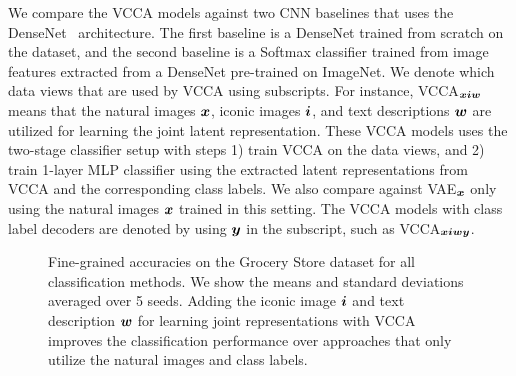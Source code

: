 We compare the VCCA models against two CNN baselines that uses the DenseNet~\cite{huang2017densely} architecture. The first baseline is a DenseNet trained from scratch on the dataset, and the second baseline is a Softmax classifier trained from image features extracted from a DenseNet pre-trained on ImageNet. We denote which data views that are used by VCCA using subscripts. For instance, VCCA$_{{\bm{x}} {\bm{i}} {\bm{w}}}$ means that the natural images ${\bm{x}}$, iconic images ${\bm{i}}$, and text descriptions ${\bm{w}}$ are utilized for learning the joint latent representation. These VCCA models uses the two-stage classifier setup with steps 1) train VCCA on the data views, and 2) train 1-layer MLP classifier using the extracted latent representations from VCCA and the corresponding class labels. We also compare against VAE$_{{\bm{x}}}$ only using the natural images ${\bm{x}}$ trained in this setting. The VCCA models with class label decoders are denoted by using ${\bm{y}}$ in the subscript, such as VCCA$_{{\bm{x}} {\bm{i}} {\bm{w}} {\bm{y}}}$. 

\begin{figure}[t]
	\centering
	\setlength{\figwidth}{0.62\textwidth}
	\setlength{\figheight}{.22\textheight}
	
	\vspace{-2mm}
	\caption{Fine-grained accuracies on the Grocery Store dataset for all classification methods. We show the means and standard deviations averaged over 5 seeds. Adding the iconic image ${\bm{i}}$ and text description ${\bm{w}}$ for learning joint representations with VCCA improves the classification performance over approaches that only utilize the natural images and class labels.}
	\label{fig:fine_grained_classification_results}
	\vspace{-4mm}
\end{figure}

